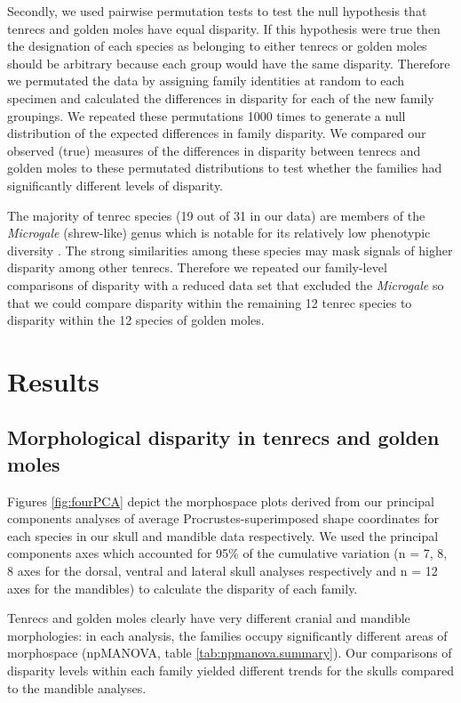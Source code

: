 \documentclass[12pt,a4paper]{article}
\begin{document}
	Secondly, we used pairwise permutation tests to test the null hypothesis that tenrecs and golden moles have equal disparity. If this hypothesis were true then the designation of each species as belonging to either tenrecs or golden moles should be arbitrary because each group would have the same disparity. Therefore we permutated the data by assigning family identities at random to each specimen and calculated the differences in disparity for each of the new family groupings. We repeated these permutations 1000 times to generate a null distribution of the expected differences in family disparity. We compared our observed (true) measures of the differences in disparity between tenrecs and golden moles to these permutated distributions to test whether the families had significantly different levels of disparity.

	The majority of tenrec species (19 out of 31 in our data) are members of the \textit{Microgale} (shrew-like) genus which is notable for its relatively low phenotypic diversity \citep{ Soarimalala2011, Jenkins2003}. The strong similarities among these species may mask signals of higher disparity among other tenrecs. Therefore we repeated our family-level comparisons of disparity with a reduced data set that excluded the \textit{Microgale} so that we could compare disparity within the remaining 12 tenrec species to disparity within the 12 species of golden moles.



\section{Results}


\subsection{Morphological disparity in tenrecs and golden moles} 
 
	Figures  \ref{fig:fourPCA} depict the morphospace plots derived from our principal components analyses of average Procrustes-superimposed shape coordinates for each species in our skull and mandible data respectively. We used the principal components axes which accounted for 95\% of the cumulative variation (n = 7, 8, 8 axes for the dorsal, ventral and lateral skull analyses respectively and n = 12 axes for the mandibles) to calculate the disparity of each family. 

	Tenrecs and golden moles clearly have very different cranial and mandible morphologies: in each analysis, the families occupy significantly different areas of morphospace (npMANOVA, table \ref{tab:npmanova.summary}). 
	Our comparisons of disparity levels within each family yielded different trends for the skulls compared to the mandible analyses.
	
\end{document}
